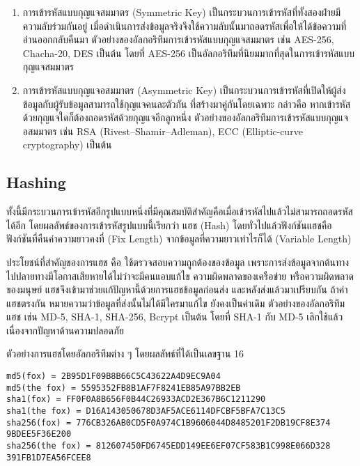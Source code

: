 \begin{enumerate}
	\item การเข้ารหัสแบบกุญแจสมมาตร (Symmetric Key) เป็นกระบวนการเข้ารหัสที่ทั้งสองฝ่ายมีความลับร่วมกันอยู่ เมื่อดำเนินการส่งข้อมูลจริงจึงใช้ความลับนั้นมาถอดรหัสเพื่อให้ได้ข้อความที่อ่านออกกลับคืนมา ตัวอย่างของอัลกอริทึมการเข้ารหัสแบบกุญแจสมมาตร เช่น AES-256, Chacha-20, DES เป็นต้น โดยที่ AES-256 เป็นอัลกอริทึมที่นิยมมากที่สุดในการเข้ารหัสแบบกุญแจสมมาตร
	\item การเข้ารหัสแบบกุญแจอสมมาตร (Asymmetric Key) เป็นกระบวนการเข้ารหัสที่เปิดให้ผู้ส่งข้อมูลกับผู้รับข้อมูลสามารถใช้กุญแจคนละตัวกัน ที่สร้างมาคู่กันโดยเฉพาะ กล่าวคือ หากเข้ารหัสด้วยกุญแจใดก็ต้องถอดรหัสด้วยกุญแจอีกลูกหนึ่ง ตัวอย่างของอัลกอริทึมการเข้ารหัสแบบกุญแจอสมมาตร เช่น RSA (Rivest–Shamir–Adleman), ECC (Elliptic-curve cryptography) เป็นต้น
\end{enumerate}

\subsection{Hashing}

ทั้งนี้มีกระบวนการเข้ารหัสอีกรูปแบบหนึ่งที่มีคุณสมบัติสำคัญคือเมื่อเข้ารหัสไปแล้วไม่สามารถถอดรหัสได้อีก โดยผลลัพธ์ของการเข้ารหัสรูปแบบนี้เรียกว่า แฮช (Hash) โดยทั่วไปแล้วฟังก์ชันแฮชคือฟังก์ชันที่คืนค่าความยาวคงที่ (Fix Length) จากข้อมูลที่ความยาวเท่าไรก็ได้ (Variable Length)

ประโยชน์ที่สำคัญของการแฮช คือ ใช้ตรวจสอบความถูกต้องของข้อมูล เพราะการส่งข้อมูลจากต้นทางไปปลายทางมีโอกาสเสียหายได้ไม่ว่าจะมีคนแอบแก้ไข ความผิดพลาดของเครือข่าย หรือความผิดพลาดของมนุษย์ แฮชจึงเข้ามาช่วยแก้ปัญหานี้ด้วยการแฮชข้อมูลก่อนส่ง และหลังส่งแล้วมาเปรียบกัน ถ้าค่าแฮชตรงกัน หมายความว่าข้อมูลที่ส่งนั้นไม่ได้มีใครมาแก้ไข ยังคงเป็นค่าเดิม ตัวอย่างของอัลกอริทึมแฮช เช่น MD-5, SHA-1, SHA-256, Bcrypt เป็นต้น โดยที่ SHA-1 กับ MD-5 เลิกใช้แล้วเนื่องจากปัญหาด้านความปลอดภัย

ตัวอย่างการแฮชโดยอัลกอริทึมต่าง ๆ โดยผลลัพธ์ที่ได้เป็นเลขฐาน 16

\begin{lstlisting}[numbers=none] 
md5(fox) = 2B95D1F09B8B66C5C43622A4D9EC9A04
md5(the fox) = 5595352FB8B1AF7F8241EB85A97BB2EB
sha1(fox) = FF0F0A8B656F0B44C26933ACD2E367B6C1211290
sha1(the fox) = D16A143050678D3AF5ACE6114DFCBF5BFA7C13C5
sha256(fox) = 776CB326AB0CD5F0A974C1B9606044D8485201F2DB19CF8E374
9BDEE5F36E200
sha256(the fox) = 812607450FD6745EDD149EE6EF07CF583B1C998E066D328
391FB1D7EA56FCEE8
\end{lstlisting}

